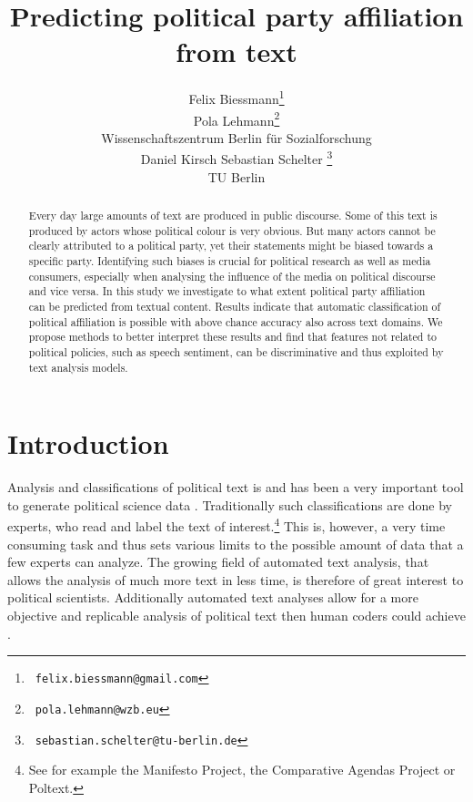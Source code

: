 \documentclass[11pt]{article}
\title{Predicting political party affiliation from text}
\author{Felix Biessmann\thanks{~\tt felix.biessmann@gmail.com}\\
    \And
 Pola Lehmann\thanks{ ~{\tt pola.lehmann@wzb.eu} }\\
  Wissenschaftszentrum Berlin für Sozialforschung\\
\And 
Daniel Kirsch
 \And
  Sebastian Schelter \thanks{~\tt sebastian.schelter@tu-berlin.de}\\ TU Berlin
}
\date{}
\begin{document}
\maketitle


\begin{abstract}
Every day large amounts of text are produced in public discourse. Some of this text is produced by actors whose political colour is very obvious. But many actors cannot be clearly attributed to a political party, yet their statements might be biased towards a specific party. Identifying such biases is crucial for political research as well as media consumers, especially when analysing the influence of the media on political discourse and vice versa. In this study we investigate to what extent political party affiliation can be predicted from textual content. Results indicate that automatic classification of political affiliation is possible with above chance accuracy also across text domains. We propose methods to better interpret these results and find that features not related to political policies, such as speech sentiment, can be discriminative and thus exploited by text analysis models. 
\end{abstract}

\section{Introduction}
\label{sec:intro}
%
Analysis and classifications of political text is and has been a very important tool to generate political science data \cite{Benoit.Forthcoming}. Traditionally such classifications are done by experts, who read and label the text of interest.\footnote{See for example the Manifesto Project, the Comparative Agendas Project or Poltext.} This is, however, a very time consuming task and thus sets various limits to the possible amount of data that a few experts can analyze. The growing field of automated text analysis, that allows the analysis of much more text in less time, is therefore of great interest to political scientists. Additionally automated text analyses allow for a more objective and replicable analysis of political text then human coders could achieve \cite{Benoit.2}.
\end{document}
